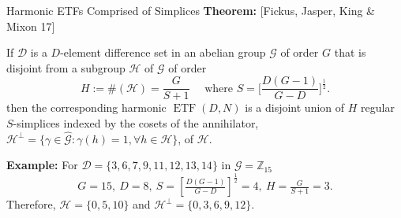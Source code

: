 \documentclass[12pt]{beamer}
\newcommand{\bbZ}{\mathbb{Z}}
\newcommand{\calD}{\mathcal{D}}
\newcommand{\calG}{\mathcal{G}}
\newcommand{\calH}{\mathcal{H}}
\newcommand{\ETF}{{\operatorname{ETF}}}
\newcommand{\biggbracket}[1]{\biggl[{#1}\biggr]}
\begin{document}
\begin{frame}{Harmonic ETFs Comprised of Simplices}
\textbf{Theorem:}
[Fickus, Jasper, King \& Mixon 17]\smallskip

If $\calD$ is a $D$-element difference set in an abelian group $\calG$ of order $G$ that is disjoint from a subgroup $\calH$ of $\calG$ of order 
\begin{equation*}
H:=\#(\calH)=\frac{G}{S+1}
\quad\text{ where }S=\biggbracket{\frac{D(G-1)}{G-D}}^{\frac12}.
\end{equation*}
then the corresponding harmonic $\ETF(D,N)$ is a disjoint union of $H$ regular $S$-simplices indexed by the cosets of the annihilator, $\calH^\perp=\{\gamma\in\hat{\calG}:\gamma(h)=1, \forall h\in\calH\}$, of $\calH$.

\vfill

\textbf{Example:} For $\calD=\{3,6,7,9,11,12,13,14\}$ in $\calG=\bbZ_{15}$
\begin{equation*}
    G=15,\ D=8,\ S=\left[\tfrac{D(G-1)}{G-D}\right]^{\tfrac{1}{2}}=4,\ H=\tfrac{G}{S+1}=3.
\end{equation*}
Therefore, $\calH=\{0,5,10\}$ and $\calH^\perp=\{0,3,6,9,12\}$.
\end{frame}
\end{document}
